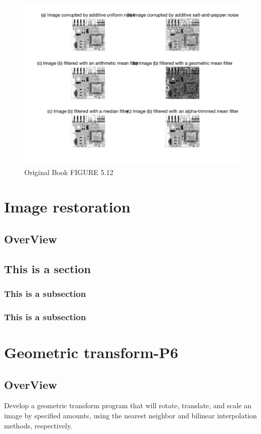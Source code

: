 \documentclass[11pt,oneside]{book}
\begin{document}
\begin{figure}[!htb]
   \centering  
   \includegraphics[width=1.0\textwidth]{images/4/order3.jpg}
   \caption{Original Book FIGURE 5.12}
\end{figure}
\newpage
\chapter{Image restoration}
\section{OverView}


\section{This is a section}
\subsection{This is a subsection}
\subsection{This is a subsection}



\chapter{Geometric transform-P6}
\section{OverView}
Develop a geometric transform program that will rotate, translate, and scale an image by specified amounts, using the nearest neighbor and bilinear interpolation methods, respectively.
\end{document}
